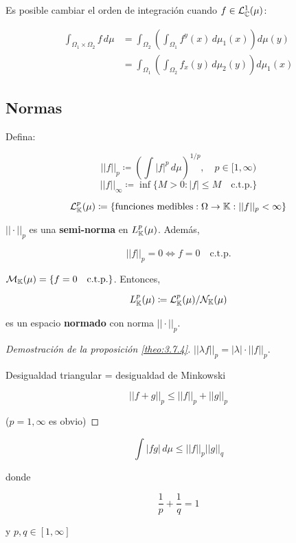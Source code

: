 \begin{ftheorem}[Fubini]
    Es posible cambiar el orden de integración cuando $f\in \mathcal{L}_{\mathbb{C}}^1(\mu)$:

    \begin{align*}
        \int_{\Omega_1\times\Omega_2}f\,d\mu&=\int_{\Omega_2}\left(\int_{\Omega_1} f^y(x)\,d\mu_1(x)\right)d\mu(y)\\
        &=\int_{\Omega_1}\left(\int_{\Omega_2} f_x(y)\,d\mu_2(y)\right)d\mu_1(x)
    \end{align*}

\end{ftheorem}

\subsection{Normas}

Defina: 

\[||f||_p\coloneqq \left(\int |f|^p\,d\mu\right)^{1/p},\quad p\in[1,\infty)\]
\[||f||_\infty\coloneqq \inf\{M>0: |f|\leq M\quad \text{c.t.p.}\}\]

\[\mathcal{L}_{\mathbb{K}}^p(\mu)\coloneqq \{\text{funciones medibles}:\Omega\to\mathbb{K}:||f||_p<\infty\}\]

\begin{fproposition}\label{theo:3.7.4}
    $||\cdot||_p$ es una \textbf{semi-norma} en $L_{\mathbb{K}}^p(\mu)$. Además, 

    \[||f||_p=0\iff f=0\quad\text{c.t.p.}\]
\end{fproposition}

\begin{fcorollary}
    $\mathcal{M}_{\mathbb{K}}(\mu)=\{f=0\quad \text{c.t.p.}\}$. Entonces, 

    \[L_{\mathbb{K}}^p(\mu)\coloneqq \mathcal{L}_{\mathbb{K}}^p(\mu)/\mathcal{N}_{\mathbb{K}}(\mu)\]

    es un espacio \textbf{normado} con norma $||\cdot||_p$.
\end{fcorollary}

\begin{proof}[Demostración de la proposición \ref{theo:3.7.4}]
    $||\lambda f||_p=|\lambda|\cdot ||f||_p$.

    Desigualdad triangular = desigualdad de Minkowski

    \[||f+g||_p\leq ||f||_p+||g||_p\]

    ($p=1,\infty$ es obvio)
\end{proof}

\begin{ftheorem}

    \[\int |fg|\,d\mu\leq ||f||_p ||g||_q\]

    donde

    \[\frac{1}{p}+\frac{1}{q}=1\]

    y $p,q\in [1,\infty]$
    
\end{ftheorem}

